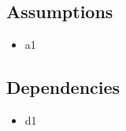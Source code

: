 \subsection{Assumptions}
\begin{itemize}
  \item a1
\end{itemize}
\subsection{Dependencies}
\begin{itemize}
  \item d1
\end{itemize}